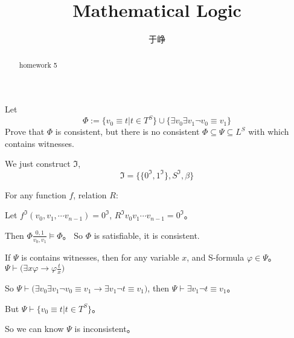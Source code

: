 \documentclass{ximera}
\begin{document}
\title{Mathematical Logic}
\author{于峥}

\begin{abstract}
    homework 5
\end{abstract}
\maketitle

\begin{problem}
    Let
    $$
        \Phi := \{ v_0 \equiv t | t \in T^S \} 
        \cup \{ \exists v_0 \exists v_1 \neg v_0 \equiv v_1 \}
    $$
    Prove that $\Phi$ is consistent, but there is no 
    consistent $\Phi \subseteq \Psi \subseteq L^S$ with which contains witnesses.    
    \begin{solution}
        We just construct $\mathfrak{I}$,
        $$
        \mathfrak{I} = \{ \{ 0^{\mathfrak{I}}, 1^{\mathfrak{I}} \}, S^{\mathfrak{I}},\beta \}
        $$

        For any function $f$, relation $R$:

        Let $f^{\mathfrak{I}}(v_0,v_1,\cdots v_{n-1})=0^{\mathfrak{I}}$, $R^{\mathfrak{I}}v_0v_1\cdots v_{n-1}=0^{\mathfrak{I}}$。
        
        Then $\Phi \frac {0, 1} {v_0, v_1} \models \Phi$。
        So $\Phi$ is satisfiable, it is consistent.

        If $\Psi$ is contains witnesses, then for any variable $x$, and S-formula $\varphi \in \Psi$。
        $\Psi \vdash \Big( \exists x \varphi \rightarrow \varphi \frac t x\Big)$

        So $\Psi \vdash \Big(\exists v_0 \exists v_1 \neg v_0 \equiv v_1 \rightarrow \exists v_1 \neg t \equiv v_1 \Big)$, then 
        $\Psi \vdash \exists v_1 \neg t \equiv v_1$。

        But $\Psi \vdash \{ v_0 \equiv t | t \in T^S \} $。

        So we can know $\Psi$ is inconsistent。
    \end{solution}
\end{problem}
\end{document}
